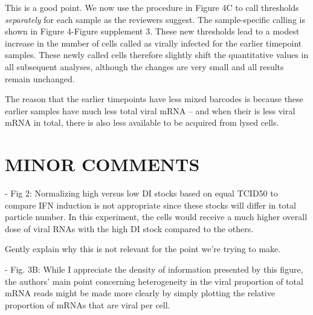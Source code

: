 \documentclass[11pt, oneside]{article}   	%
\begin{document}
{\color{black}
This is a good point. 
We now use the procedure in Figure 4C to call thresholds \emph{separately} for each sample as the reviewers suggest.
The sample-specific calling is shown in Figure 4-Figure supplement 3.
These new thresholds lead to a modest increase in the number of cells called as virally infected for the earlier timepoint samples.
These newly called cells therefore slightly shift the quantitative values in all subsequent analyses, although the changes are very small and all results remain unchanged.

The reason that the earlier timepoints have less mixed barcodes is because these earlier samples have much less total viral mRNA -- and when their is less viral mRNA in total, there is also less available to be acquired from lysed cells.
}

\section*{MINOR COMMENTS}

- Fig 2: Normalizing high versus low DI stocks based on equal TCID50 to compare IFN induction is not appropriate since these stocks will differ in total particle number. In this experiment, the cells would receive a much higher overall dose of viral RNAs with the high DI stock compared to the others. 

{\color{red}
Gently explain why this is not relevant for the point we're trying to make.
}

- Fig. 3B: While I appreciate the density of information presented by this figure, the authors' main point concerning heterogeneity in the viral proportion of total mRNA reads might be made more clearly by simply plotting the relative proportion of mRNAs that are viral per cell. 
\end{document}
